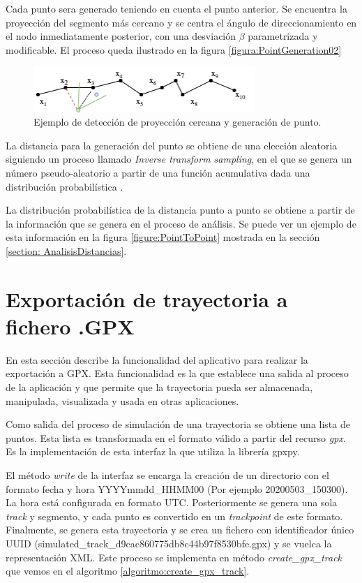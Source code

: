 Cada punto sera generado teniendo en cuenta el punto anterior. Se encuentra la proyección del segmento más cercano y se centra el ángulo de direccionamiento en el nodo inmediatamente posterior, con una desviación $\beta$ parametrizada y modificable. El proceso queda ilustrado en la figura \ref{figura:PointGeneration02}

\begin{figure}[!htb]
\begin{center}
\includegraphics[width=0.75\textwidth]{./Imagenes/PointGeneration02.png}
\caption{Ejemplo de detección de proyección cercana y generación de punto.}
\label{figure:PointGeneration02}
\end{center}
\end{figure}

La distancia para la generación del punto se obtiene de una elección aleatoria siguiendo un proceso 
llamado \textit{Inverse transform sampling}, en el que se genera un número pseudo-aleatorio a partir 
de una función acumulativa dada una distribución probabilística \cite{Sigman01}.

La distribución probabilística de la distancia punto a punto se obtiene a partir de la información 
que se genera en el proceso de análisis. Se puede ver un ejemplo de esta información en la figura \ref{figure:PointToPoint} mostrada en la sección \ref{section: AnalisisDistancias}.

\section{Exportación de trayectoria a fichero .\ac{GPX}}
En esta sección describe la funcionalidad del aplicativo para realizar la exportación a \ac{GPX}. Esta 
funcionalidad es la que establece una salida al proceso de la aplicación y que permite que la 
trayectoria pueda ser almacenada, manipulada, visualizada y usada en otras aplicaciones.

Como salida del proceso  de simulación de una trayectoria se obtiene una lista de puntos. Esta lista es 
transformada en el formato válido a partir del recurso \textit{gpx}. Es la implementación de 
esta interfaz la que utiliza la librería gpxpy. 

El método \textit{write} de la interfaz se encarga la creación de un directorio con el formato fecha y hora 
YYYYmmdd\_HHMM00 (Por ejemplo 20200503\_150300). La hora está configurada en formato 
\ac{UTC}. Posteriormente se genera una sola \textit{track} y segmento, y cada punto es convertido en 
un \textit{trackpoint} de este formato. Finalmente, se genera esta trayectoria y se crea un fichero con 
identificador único \ac{UUID} (simulated\_track\_d9cac860\-775d\-b8c4\-4b97f8530bfe.gpx) y 
se vuelca la representación \ac{XML}. Este proceso se implementa en método \textit{create\_gpx\_track} que vemos en el algoritmo \ref{algoritmo:create_gpx_track}.

